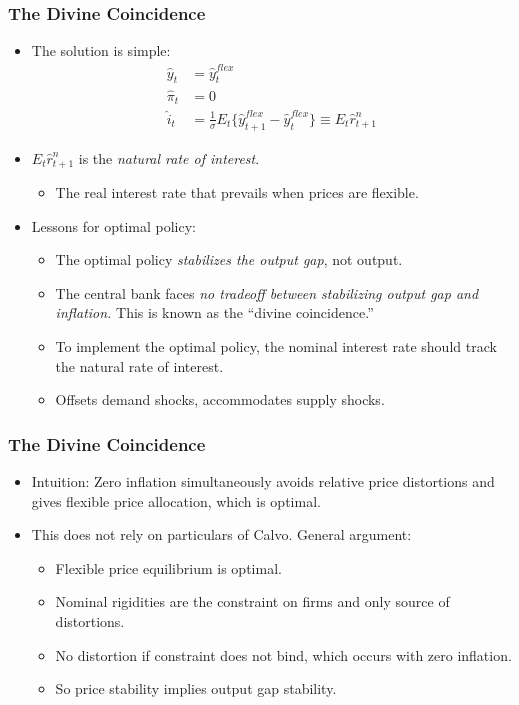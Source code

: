 \documentclass[english,xcolor=svgnames]{beamer}
\begin{document}
\begin{frame}
\frametitle{The Divine Coincidence}
\begin{itemize}
	\item The solution is simple:
	\begin{align*}
		\hat{y}_t&=\hat{y}_t^{flex} \\
		\hat{\pi}_t&=0 \\
		\hat{i}_t&=\frac{1}{\sigma}E_t\{\hat{y}_{t+1}^{flex} - \hat{y}_t^{flex}\} \equiv E_t\hat{r}_{t+1}^n 
	\end{align*}
	\item $E_t\hat{r}_{t+1}^n$ is the \emph{natural rate of interest}.
	\begin{itemize}
		\item The real interest rate that prevails when prices are flexible.
	\end{itemize}
	\item Lessons for optimal policy:
	\begin{itemize}
		\item The optimal policy \emph{stabilizes the output gap}, not output.
		\item The central bank faces \emph{no tradeoff between stabilizing output
gap and inflation.} This is known as the ``divine coincidence.''
		\item To implement the optimal policy, the nominal interest rate should track the natural rate of interest.
		\item Offsets demand shocks, accommodates supply shocks.
	\end{itemize}
\end{itemize}
\end{frame}


\begin{frame}
\frametitle{The Divine Coincidence}
\begin{itemize}
	\item Intuition: Zero inflation simultaneously avoids relative price
distortions and gives flexible price allocation, which is optimal.
	\item This does not rely on particulars of Calvo. General argument:
	\begin{itemize}
		\item Flexible price equilibrium is optimal.
		\item Nominal rigidities are the constraint on firms and only source
of distortions.
		\item No distortion if constraint does not bind, which occurs with zero inflation.
		\item So price stability implies output gap stability.
	\end{itemize}
\end{itemize}
\end{frame}
\end{document}
